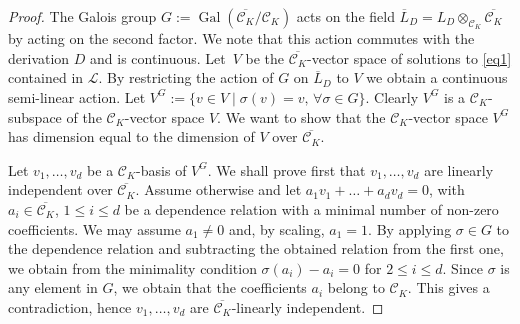 \documentclass[pdftex]{sigma}%
\numberwithin{equation}{section}
\def \Gal{\operatorname{Gal}}
\begin{document}
\begin{proof}
The Galois group $G:=\Gal(\overline{\mathcal{C}_K}/\mathcal{C}_K)$ acts on the field $\overline{L}_D=L_D\otimes_{\mathcal{C}_K} \overline{\mathcal{C}_K}$ by acting on the second factor. We note that this action commutes with the derivation $D$ and is continuous. Let~$V$ be the $\overline{\mathcal{C}_K}$-vector space of solutions to \eqref{eq1} contained in $\mathcal{L}$. By restricting the action of $G$ on $\overline{L}_D$ to $V$ we obtain a continuous semi-linear action. Let $V^G:=\{ v \in V \mid \sigma(v)=v, \, \forall \sigma \in G \}$. Clearly $V^G$ is a $\mathcal{C}_K$-subspace of the $\mathcal{C}_K$-vector space $V$. We want to show that the $\mathcal{C}_K$-vector space $V^G$ has dimension equal to the dimension of $V$ over $\overline{\mathcal{C}_K}$.

Let $v_1,\dots,v_d$ be a $\mathcal{C}_K$-basis of $V^G$. We shall prove first that $v_1,\dots,v_d$ are linearly independent over $\overline{\mathcal{C}_K}$. Assume otherwise and let $a_1v_1+\dots +a_dv_d=0$, with $a_i \in \overline{\mathcal{C}_K}$, $1 \leq i \leq d$ be a dependence relation with a minimal number of non-zero coefficients. We may assume $a_1 \neq 0$ and, by scaling, $a_1=1$. By applying $\sigma \in G$ to the dependence relation and subtracting the obtained relation from the first one, we obtain from the minimality condition $\sigma(a_i)-a_i=0$ for $2\leq i \leq d$. Since $\sigma$ is any element in $G$, we obtain that the coefficients $a_i$ belong to $\mathcal{C}_K$. This gives a contradiction, hence $v_1,\dots,v_d$ are $\overline{\mathcal{C}_K}$-linearly independent.


\end{proof}
\end{document}
